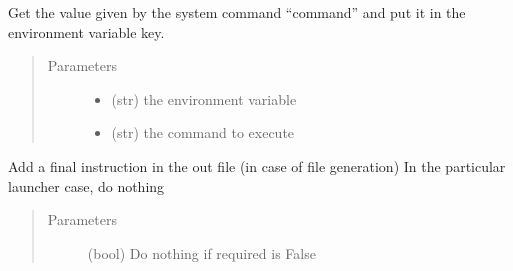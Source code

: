 \documentclass[a4paper,10pt,english]{sphinxmanual}
\begin{document}
\begin{fulllineitems}
\begin{fulllineitems}
\end{fulllineitems}


\begin{fulllineitems}
\label{\detokenize{apidoc_src/src:src.fileEnviron.LauncherFileEnviron.command_value}}
Get the value given by the system command “command” 
and put it in the environment variable key.
\begin{quote}\begin{description}
\item[{Parameters}] \leavevmode\begin{itemize}
\item {} 
 \textendash{} (str) the environment variable

\item {} 
 \textendash{} (str) the command to execute

\end{itemize}

\end{description}\end{quote}

\end{fulllineitems}


\begin{fulllineitems}
\label{\detokenize{apidoc_src/src:src.fileEnviron.LauncherFileEnviron.finish}}
Add a final instruction in the out file (in case of file generation)
In the particular launcher case, do nothing
\begin{quote}\begin{description}
\item[{Parameters}] \leavevmode
{} \textendash{} (bool) Do nothing if required is False

\end{description}\end{quote}

\end{fulllineitems}



\end{fulllineitems}
\end{document}

